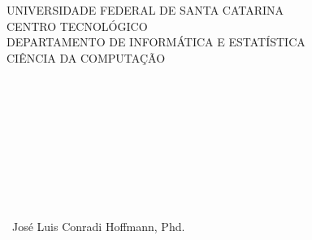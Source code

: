 \documentclass[
    12pt,
    oneside,
    a4paper,
    chapter=TITLE,
    section=TITLE,
    english,
    brazil
]{abntex2}
\newcommand{\coorientadordois}{José Luis Conradi Hoffmann, Phd.}
\begin{document}
\frenchspacing


\pretextual

\begin{capa}
\centering
\fontsize{12}{14}\selectfont
UNIVERSIDADE FEDERAL DE SANTA CATARINA\\
CENTRO TECNOLÓGICO\\
DEPARTAMENTO DE INFORMÁTICA E ESTATÍSTICA\\
CIÊNCIA DA COMPUTAÇÃO\\[4cm]

{\fontsize{12}{14}\selectfont \imprimirautor}\\[4cm]

{\fontsize{14}{16}\selectfont\bfseries \imprimirtitulo}

\vfill
{\fontsize{12}{14}\selectfont \imprimirlocal}\\
{\fontsize{12}{14}\selectfont \imprimirdata}
\end{capa}

\begin{folhaderosto}
\begin{center}
{\fontsize{12}{14}\selectfont \imprimirautor}\\[6cm]

{\fontsize{14}{16}\selectfont\bfseries \imprimirtitulo}\\[3cm]
\end{center}

\noindent\hspace*{0.4\textwidth}%
\begin{minipage}{0.6\textwidth}
\fontsize{12}{14}\selectfont
\SingleSpacing
\imprimirpreambulo

\vspace{1em}
\imprimirorientadorRotulo~\imprimirorientador

\imprimircoorientadorRotulo~\imprimircoorientador

\imprimircoorientadorRotulo~\coorientadordois
\end{minipage}

\vfill
\begin{center}
{\fontsize{12}{14}\selectfont \imprimirlocal}\\
{\fontsize{12}{14}\selectfont \imprimirdata}
\end{center}
\end{folhaderosto}
\end{document}
